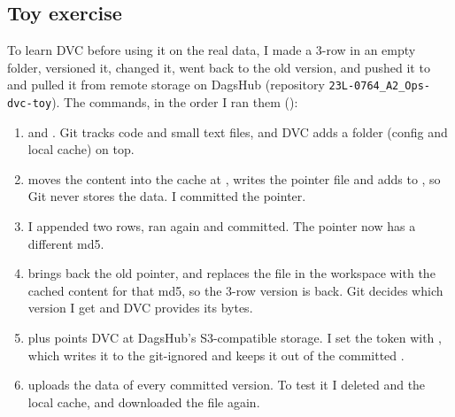 \subsection*{Toy exercise}
To learn DVC before using it on the real data, I made a 3-row  in an empty folder,
versioned it, changed it, went back to the old version, and pushed it to and pulled it from remote
storage on DagsHub (repository \texttt{23L-0764\_A2\_Ops-dvc-toy}). The commands, in the order I ran
them ():
\begin{enumerate}
\item {} and . Git tracks code and small text files, and DVC adds a
 folder (config and local cache) on top.
\item {} moves the content into the cache at , writes
the pointer file  and adds  to , so Git
never stores the data. I committed the pointer.
\item I appended two rows, ran  again and committed. The pointer now has a different
md5.
\item {} brings back the old pointer, and
 replaces the file in the workspace with the cached content for that md5, so the
3-row version is back. Git decides which version I get and DVC provides its bytes.
\item {} plus  points DVC at DagsHub's
S3-compatible storage. I set the token with , which writes it to the git-ignored
 and keeps it out of the committed .
\item {} uploads the data of every committed version. To test it I
deleted  and the local cache, and  downloaded the file again.
\end{enumerate}


